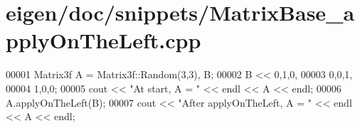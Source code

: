 \hypertarget{eigen_2doc_2snippets_2_matrix_base__apply_on_the_left_8cpp_source}{}\section{eigen/doc/snippets/\+Matrix\+Base\+\_\+apply\+On\+The\+Left.cpp}
\label{eigen_2doc_2snippets_2_matrix_base__apply_on_the_left_8cpp_source}

\begin{DoxyCode}
00001 Matrix3f A = Matrix3f::Random(3,3), B;
00002 B << 0,1,0,  
00003      0,0,1,  
00004      1,0,0;
00005 cout << \textcolor{stringliteral}{"At start, A = "} << endl << A << endl;
00006 A.applyOnTheLeft(B); 
00007 cout << \textcolor{stringliteral}{"After applyOnTheLeft, A = "} << endl << A << endl;
\end{DoxyCode}
